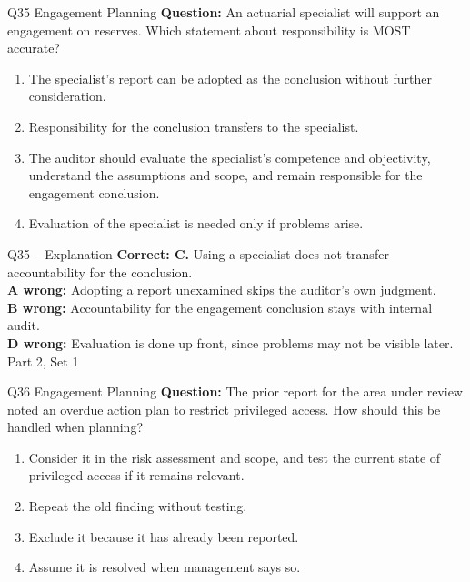 \documentclass[aspectratio=169,10pt]{beamer}
\begin{document}
\begin{frame}[t]{Q35 \hfill {\scriptsize Engagement Planning}}
	\small
	\textbf{Question:} An actuarial specialist will support an engagement on reserves. Which statement about responsibility is MOST accurate?
	\begin{enumerate}[label=\Alph*.,itemsep=1pt,topsep=3pt]
			\item The specialist's report can be adopted as the conclusion without further consideration.
			\item Responsibility for the conclusion transfers to the specialist.
			\item The auditor should evaluate the specialist's competence and objectivity, understand the assumptions and scope, and remain responsible for the engagement conclusion.
			\item Evaluation of the specialist is needed only if problems arise.
	\end{enumerate}
\end{frame}
\begin{frame}[t]{Q35 -- Explanation}
	\footnotesize
	\textbf{Correct: C.} Using a specialist does not transfer accountability for the conclusion. \\[5pt]
\textbf{A wrong:} Adopting a report unexamined skips the auditor's own judgment. \\[3pt]
\textbf{B wrong:} Accountability for the engagement conclusion stays with internal audit. \\[3pt]
\textbf{D wrong:} Evaluation is done up front, since problems may not be visible later. \\[3pt]
	\vfill {\tiny Part 2, Set 1}
\end{frame}
\begin{frame}[t]{Q36 \hfill {\scriptsize Engagement Planning}}
	\small
	\textbf{Question:} The prior report for the area under review noted an overdue action plan to restrict privileged access. How should this be handled when planning?
	\begin{enumerate}[label=\Alph*.,itemsep=1pt,topsep=3pt]
			\item Consider it in the risk assessment and scope, and test the current state of privileged access if it remains relevant.
			\item Repeat the old finding without testing.
			\item Exclude it because it has already been reported.
			\item Assume it is resolved when management says so.
	\end{enumerate}
\end{frame}
\end{document}
